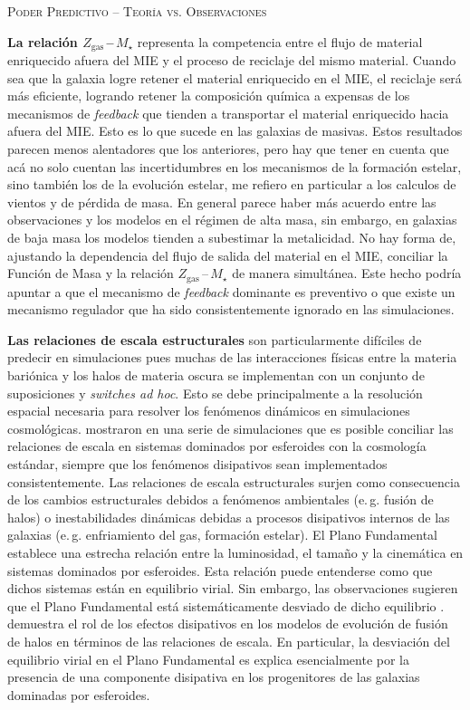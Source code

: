\documentclass[xcolor=dvipsnames,4pt,hyperref={colorlinks,citecolor=black,linkcolor=black,urlcolor=black}]{beamer}
\begin{document}
\begin{frame}[allowframebreaks]{\textsc{Poder Predictivo -- Teoría vs. Observaciones}}
\begin{description}
\textbf{La relación $Z_\text{gas}\,$--$\,M_\star$} representa la competencia entre el flujo de
material enriquecido afuera del MIE y el proceso de reciclaje del mismo material. Cuando sea que la
galaxia logre retener el material enriquecido en el MIE, el reciclaje será más eficiente, logrando
retener la composición química a expensas de los mecanismos de \emph{feedback} que tienden a
transportar el material enriquecido hacia afuera del MIE. Esto es lo que sucede en las galaxias de
masivas.
Estos resultados parecen menos alentadores que los anteriores, pero hay que tener en cuenta que acá
no solo cuentan las incertidumbres en los mecanismos de la formación estelar, sino también los de la
evolución estelar, me refiero en particular a los calculos de vientos y de pérdida de masa. En
general parece haber más acuerdo entre las observaciones y los modelos en el régimen de alta masa,
sin embargo, en galaxias de baja masa los modelos tienden a subestimar la metalicidad. No hay forma
de, ajustando la dependencia del flujo de salida del material en el MIE, conciliar la Función de
Masa y la relación $Z_\text{gas}\,$--$\,M_\star$ de manera simultánea. Este hecho podría apuntar a
que el mecanismo de \emph{feedback} dominante es preventivo o que existe un mecanismo regulador que
ha sido consistentemente ignorado en las simulaciones.

\textbf{Las relaciones de escala estructurales} son particularmente difíciles de predecir en
simulaciones pues muchas de las interacciones físicas entre la materia bariónica y los halos de
materia oscura se implementan con un conjunto de suposiciones y \emph{switches ad hoc}. Esto se debe
principalmente a la resolución espacial necesaria para resolver los fenómenos dinámicos en
simulaciones cosmológicas. \citeauthor{Hopkins2009} mostraron en una serie de simulaciones que es
posible conciliar las relaciones de escala en sistemas dominados por esferoides con la cosmología
estándar, siempre que los fenómenos disipativos sean implementados consistentemente. Las relaciones
de escala estructurales surjen como consecuencia de los cambios estructurales debidos a fenómenos
ambientales (e.\,g. fusión de halos) o inestabilidades dinámicas debidas a procesos disipativos
internos de las galaxias (e.\,g. enfriamiento del gas, formación estelar). El Plano Fundamental
establece una estrecha relación entre la luminosidad, el tamaño y la cinemática en sistemas
dominados por esferoides. Esta relación puede entenderse como que dichos sistemas están en
equilibrio virial. Sin embargo, las observaciones sugieren que el Plano Fundamental está
sistemáticamente desviado de dicho equilibrio \citep[véase discusión en][]{Cappellari2016}.
\citep{Hopkins2009} demuestra el rol de los efectos disipativos en los modelos de evolución de
fusión de halos en términos de las relaciones de escala. En particular, la desviación del equilibrio
virial en el Plano Fundamental es explica esencialmente por la presencia de una componente
disipativa en los progenitores de las galaxias dominadas por esferoides.
%
\end{description}


\end{frame}
\end{document}
